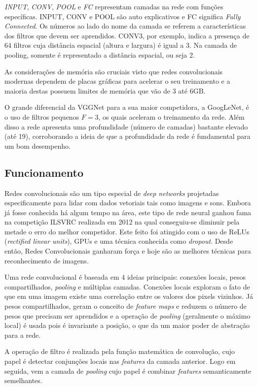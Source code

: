 \emph{INPUT}, \emph{CONV}, \emph{POOL} e \emph{FC} representam camadas na rede
com funções específicas. INPUT, CONV e POOL são auto explicativos e FC
significa \emph{Fully Connected}. Os números ao lado do nome da camada se
referem a características dos filtros que devem ser aprendidos. CONV3, por
exemplo, indica a presença de 64 filtros cuja distância espacial (altura e
largura) é igual a 3. Na camada de pooling, somente é representado a distância
espacial, ou seja 2.

As considerações de memória são cruciais visto que redes convolucionais
modernas dependem de placas gráficas para acelerar o seu treinamento e a
maioria destas possuem limites de memória que vão de 3 até 6GB\@.


O grande diferencial da VGGNet para a sua maior competidora, a GoogLeNet, é o
uso de filtros pequenos \emph{$F=3$}, os quais aceleram o treinamento da rede.
Além disso a rede apresenta uma profundidade (número de camadas) bastante
elevado (até 19), corroborando a ideia de que a profundidade da rede é
fundamental para um bom desempenho.

\subsection{Funcionamento}

Redes convolucionais são um tipo especial de \emph{deep networks} projetadas
especificamente para lidar com dados vetoriais tais como imagens e sons.
Embora já fosse conhecida há algum tempo na área, este tipo de rede neural
ganhou fama na competição ILSVRC realizada em 2012 na qual conseguiu-se
diminuir pela metade o erro do melhor competidor. Este feito foi atingido com o
uso de ReLUs (\emph{rectified linear units}), GPUs e uma técnica conhecida como
\emph{dropout}. Desde então, Redes Convolucionais ganharam força e hoje são as
melhores técnicas para reconhecimento de imagens.\cite{lecun2015deep}

Uma rede convolucional é baseada em 4 ideias principais: conexões locais, pesos
compartilhados, \emph{pooling} e múltiplas camadas. Conexões locais exploram o
fato de que em uma imagem existe uma correlação entre os valores dos pixels
vizinhos. Já pesos compartilhados, geram o conceito de \emph{feature maps} e
reduzem o número de pesos que precisam ser aprendidos e a operação de
\emph{pooling} (geralmente o máximo local) é usada pois é invariante a posição,
o que da um maior poder de abstração para a rede.\cite{lecun2015deep}

A operação de filtro é realizada pela função matemática de convolução, cujo
papel é detectar conjunções locais nas \emph{features} da camada anterior. Logo
em seguida, vem a camada de \emph{pooling} cujo papel é combinar
\emph{features} semanticamente semelhantes.\cite{lecun2015deep}

